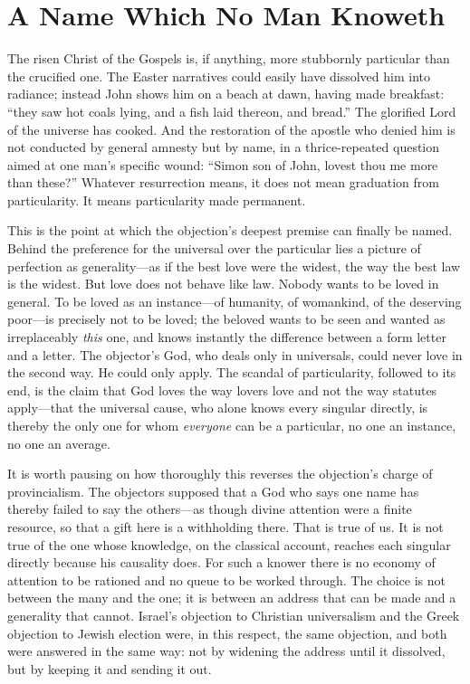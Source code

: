 \section{A Name Which No Man Knoweth}

The risen Christ of the Gospels is, if anything, more stubbornly particular than the crucified one. The Easter narratives could easily have dissolved him into radiance; instead John shows him on a beach at dawn, having made breakfast: ``they saw hot coals lying, and a fish laid thereon, and bread.'' The glorified Lord of the universe has cooked. And the restoration of the apostle who denied him is not conducted by general amnesty but by name, in a thrice-repeated question aimed at one man's specific wound: ``Simon son of John, lovest thou me more than these?'' Whatever resurrection means, it does not mean graduation from particularity. It means particularity made permanent.

This is the point at which the objection's deepest premise can finally be named. Behind the preference for the universal over the particular lies a picture of perfection as generality---as if the best love were the widest, the way the best law is the widest. But love does not behave like law. Nobody wants to be loved in general. To be loved as an instance---of humanity, of womankind, of the deserving poor---is precisely not to be loved; the beloved wants to be seen and wanted as irreplaceably \emph{this} one, and knows instantly the difference between a form letter and a letter. The objector's God, who deals only in universals, could never love in the second way. He could only apply. The scandal of particularity, followed to its end, is the claim that God loves the way lovers love and not the way statutes apply---that the universal cause, who alone knows every singular directly, is thereby the only one for whom \emph{everyone} can be a particular, no one an instance, no one an average.

It is worth pausing on how thoroughly this reverses the objection's charge of provincialism. The objectors supposed that a God who says one name has thereby failed to say the others---as though divine attention were a finite resource, so that a gift here is a withholding there. That is true of us. It is not true of the one whose knowledge, on the classical account, reaches each singular directly because his causality does. For such a knower there is no economy of attention to be rationed and no queue to be worked through. The choice is not between the many and the one; it is between an address that can be made and a generality that cannot. Israel's objection to Christian universalism and the Greek objection to Jewish election were, in this respect, the same objection, and both were answered in the same way: not by widening the address until it dissolved, but by keeping it and sending it out.

